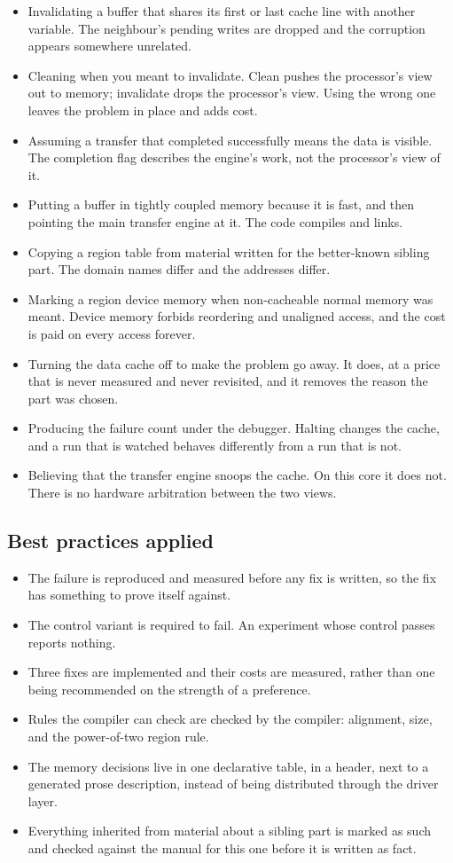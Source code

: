 \begin{itemize}
\item Invalidating a buffer that shares its first or last cache line with
another variable. The neighbour's pending writes are dropped and the corruption
appears somewhere unrelated.
\item Cleaning when you meant to invalidate. Clean pushes the processor's view
out to memory; invalidate drops the processor's view. Using the wrong one
leaves the problem in place and adds cost.
\item Assuming a transfer that completed successfully means the data is
visible. The completion flag describes the engine's work, not the processor's
view of it.
\item Putting a buffer in tightly coupled memory because it is fast, and then
pointing the main transfer engine at it. The code compiles and links.
\item Copying a region table from material written for the better-known sibling
part. The domain names differ and the addresses differ.
\item Marking a region device memory when non-cacheable normal memory was
meant. Device memory forbids reordering and unaligned access, and the cost is
paid on every access forever.
\item Turning the data cache off to make the problem go away. It does, at a
price that is never measured and never revisited, and it removes the reason the
part was chosen.
\item Producing the failure count under the debugger. Halting changes the
cache, and a run that is watched behaves differently from a run that is not.
\item Believing that the transfer engine snoops the cache. On this core it does
not. There is no hardware arbitration between the two views.
\end{itemize}

\subsection*{Best practices applied}

\begin{itemize}
\item The failure is reproduced and measured before any fix is written, so the
fix has something to prove itself against.
\item The control variant is required to fail. An experiment whose control
passes reports nothing.
\item Three fixes are implemented and their costs are measured, rather than one
being recommended on the strength of a preference.
\item Rules the compiler can check are checked by the compiler: alignment,
size, and the power-of-two region rule.
\item The memory decisions live in one declarative table, in a header, next to
a generated prose description, instead of being distributed through the driver
layer.
\item Everything inherited from material about a sibling part is marked as
such and checked against the manual for this one before it is written as fact.
\end{itemize}


